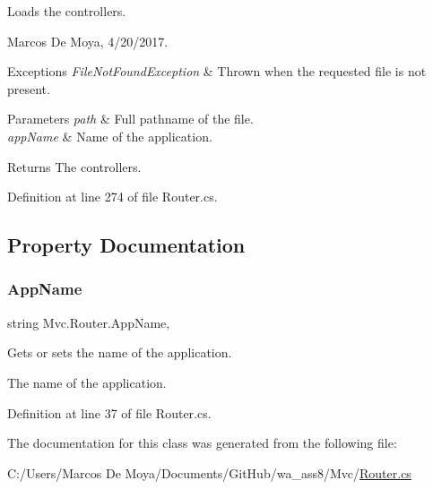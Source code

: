 Loads the controllers. 

Marcos De Moya, 4/20/2017. 


\begin{DoxyExceptions}{Exceptions}
{\em File\+Not\+Found\+Exception} & Thrown when the requested file is not present. \\
\hline
\end{DoxyExceptions}



\begin{DoxyParams}{Parameters}
{\em path} & Full pathname of the file. \\
\hline
{\em app\+Name} & Name of the application. \\
\hline
\end{DoxyParams}


\begin{DoxyReturn}{Returns}
The controllers. 
\end{DoxyReturn}


Definition at line 274 of file Router.\+cs.



\subsection{Property Documentation}
\mbox{\label{class_mvc_1_1_router_aede73d60bab62819083e10f3815babf7}} 
\subsubsection{\texorpdfstring{App\+Name}{AppName}}
{\footnotesize\ttfamily string Mvc.\+Router.\+App\+Name\hspace{0.3cm}{\ttfamily [get]}, {\ttfamily [set]}}



Gets or sets the name of the application. 

The name of the application. 

Definition at line 37 of file Router.\+cs.



The documentation for this class was generated from the following file\+:\begin{DoxyCompactItemize}
\item 
C\+:/\+Users/\+Marcos De Moya/\+Documents/\+Git\+Hub/wa\+\_\+ass8/\+Mvc/\hyperlink{_router_8cs}{Router.\+cs}\end{DoxyCompactItemize}
